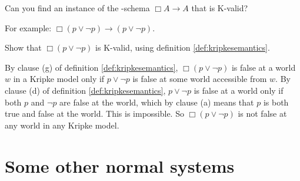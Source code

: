 \begin{exercise}
  Can you find an instance of the -schema $\Box A \to A$ that is K-valid?
\end{exercise}
\begin{solution}
  For example: $\Box(p \lor \neg p) \to (p \lor \neg p)$.
\end{solution}

\begin{exercise}
  Show that $\Box(p \lor \neg p)$ is K-valid, using definition
  \ref{def:kripkesemantics}.
\end{exercise}
\begin{solution}
  By clause (g) of definition \ref{def:kripkesemantics}, $\Box(p \lor \neg p)$
  is false at a world $w$ in a Kripke model only if $p \lor \neg p$ is false at
  some world accessible from $w$. By clause (d) of definition
  \ref{def:kripkesemantics}, $p \lor \neg p$ is false at a world only if both
  $p$ and $\neg p$ are false at the world, which by clause (a) means that $p$ is
  both true and false at the world. This is impossible. So $\Box(p \lor \neg p)$
  is not false at any world in any Kripke model.
\end{solution}

  


\section{Some other normal systems}\label{sec:normalsystems}

